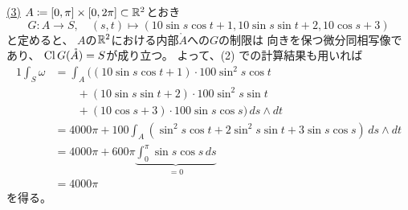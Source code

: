 \documentclass[report, notitlepage]{jlreq}
\begin{document}
\begin{answer}
    \uline{(3)} \quad
    $A \coloneqq [0, \pi] \times [0, 2\pi] \subset \mathbb{R}^2$とおき
    \begin{equation}
        G \colon A \to S,
        \quad
        (s, t) \mapsto (
            10 \sin s \cos t + 1,
            10 \sin s \sin t + 2,
            10 \cos s + 3
        )
    \end{equation}
    と定めると、
    $A$の$\mathbb{R}^2$における内部$\mathring{A}$への$G$の制限は
    向きを保つ微分同相写像であり、
    $\operatorname{Cl} G(\mathring{A}) = S$が成り立つ。
    よって、(2) での計算結果も用いれば
    \begin{alignat}{1}
        \int_S \omega
            &= \int_A \big(
                (10 \sin s \cos t + 1) \cdot 100 \sin^2 s \cos t \\
            &\qquad + (10 \sin s \sin t + 2) \cdot 100 \sin^2 s \sin t \\
            &\qquad + (10 \cos s + 3) \cdot 100 \sin s \cos s
                \big) \, ds \wedge dt \\
            &= 4000 \pi
                + 100 \int_A \left(
                    \sin^2 s \cos t
                    + 2 \sin^2 s \sin t
                    + 3 \sin s \cos s
                \right) \, ds \wedge dt \\
            &= 4000 \pi
                + 600 \pi \underbrace{\int_0^{\pi} \sin s \cos s \, ds}_{= 0} \\
            &= 4000 \pi
    \end{alignat}
    を得る。
\end{answer}

\begin{problem}[問4]
\end{problem}
\end{document}
